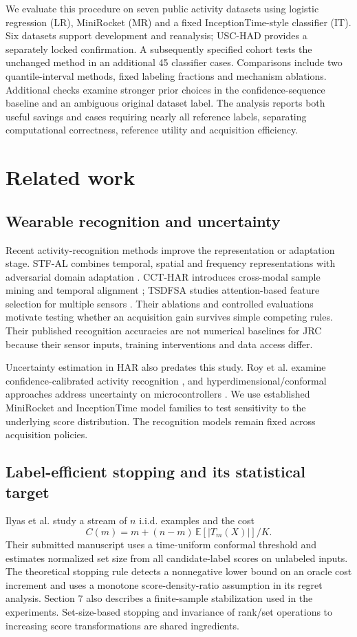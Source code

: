 \documentclass[pdflatex,sn-basic,Numbered,iicol]{sn-jnl}
\begin{document}
We evaluate this procedure on seven public activity datasets using logistic regression (LR), MiniRocket (MR) and a fixed InceptionTime-style classifier (IT). Six datasets support development and reanalysis; USC-HAD provides a separately locked confirmation. A subsequently specified cohort tests the unchanged method in an additional 45 classifier cases. Comparisons include two quantile-interval methods, fixed labeling fractions and mechanism ablations. Additional checks examine stronger prior choices in the confidence-sequence baseline and an ambiguous original dataset label. The analysis reports both useful savings and cases requiring nearly all reference labels, separating computational correctness, reference utility and acquisition efficiency.

\section{Related work}
\subsection{Wearable recognition and uncertainty}
Recent activity-recognition methods improve the representation or adaptation stage. STF-AL combines temporal, spatial and frequency representations with adversarial domain adaptation \cite{stfal}. CCT-HAR introduces cross-modal sample mining and temporal alignment \cite{ccthar}; TSDFSA studies attention-based feature selection for multiple sensors \cite{tsdfsa}. Their ablations and controlled evaluations motivate testing whether an acquisition gain survives simple competing rules. Their published recognition accuracies are not numerical baselines for JRC because their sensor inputs, training interventions and data access differ.

Uncertainty estimation in HAR also predates this study. Roy et al. examine confidence-calibrated activity recognition \cite{roy}, and hyperdimensional/conformal approaches address uncertainty on microcontrollers \cite{hduq}. We use established MiniRocket \cite{minirocket} and InceptionTime \cite{inception} model families to test sensitivity to the underlying score distribution. The recognition models remain fixed across acquisition policies.

\subsection{Label-efficient stopping and its statistical target}
Ilyas et al. \cite{ilyas} study a stream of $n$ i.i.d. examples and the cost
\begin{equation}
 C(m)=m+(n-m)\,\mathbb E[|T_m(X)|]/K.
 \label{eq:relatedcost}
\end{equation}
Their submitted manuscript uses a time-uniform conformal threshold and estimates normalized set size from all candidate-label scores on unlabeled inputs. The theoretical stopping rule detects a nonnegative lower bound on an oracle cost increment and uses a monotone score-density-ratio assumption in its regret analysis. Section 7 also describes a finite-sample stabilization used in the experiments. Set-size-based stopping and invariance of rank/set operations to increasing score transformations are shared ingredients.
\end{document}
